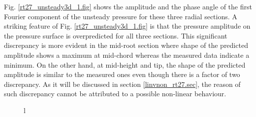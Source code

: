 %
%
 Fig. \ref{rt27_unsteady3d_1.fig} shows the amplitude and the
 phase angle of the first Fourier component of the unsteady pressure
 for these three radial sections.
 A striking feature of Fig. \ref{rt27_unsteady3d_1.fig} is that
 the pressure amplitude on the pressure surface is overpredicted
 for all three sections.
 This significant discrepancy is more evident in
 the mid-root section where shape of the predicted amplitude shows a maximum
 at mid-chord whereas the measured data indicate a minimum.
 On the other hand, at mid-height and tip, the shape of the predicted amplitude
 is similar to the measured ones even though there is a factor of two discrepancy.
 As it will be discussed in section \ref{linvnon_rt27.sec}, the reason of
 such discrepancy cannot be attributed to a possible
 non-linear behaviour.
%
%
\begin{figure}
  \begin{flushleft}
   \begin{tabular}{l}
\end{tabular}
\end{flushleft}
\end{figure}

